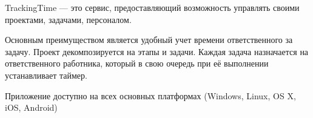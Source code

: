 
TrackingTime --- это сервис, предоставляющий возможность управлять своими проектами, задачами, персоналом.

Основным преимуществом является удобный учет времени ответственного за задачу. 
Проект декомпозируется на этапы и задачи.
Каждая задача назначается на ответственного работника, который в свою очередь при её выполнении устанавливает таймер.

Приложение доступно на всех основных платформах (Windows, Linux, OS X, iOS, Android)
